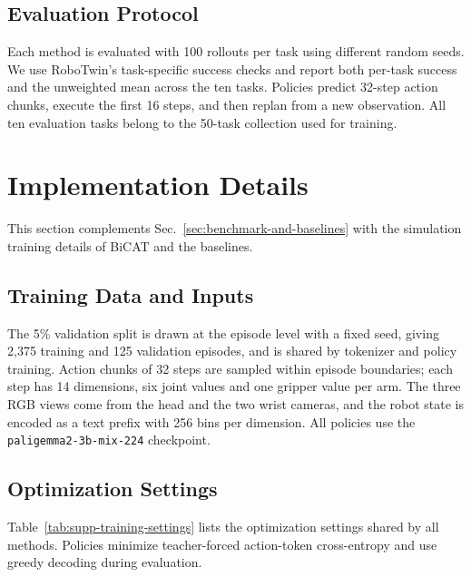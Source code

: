 \subsection{Evaluation Protocol}
\label{app:robotwin-eval-protocol}

Each method is evaluated with 100 rollouts per task using different random
seeds. We use RoboTwin's task-specific success checks and report both
per-task success and the unweighted mean across the ten tasks.
Policies predict 32-step action chunks, execute the first 16 steps, and
then replan from a new observation. All ten evaluation tasks belong to
the 50-task collection used for training.

\section{Implementation Details}
\label{app:baselines}

This section complements Sec.~\ref{sec:benchmark-and-baselines} with the
simulation training details of BiCAT and the baselines.

\subsection{Training Data and Inputs}
\label{app:baseline-data}

The 5\% validation split is drawn at the episode level with a fixed seed,
giving 2,375 training and 125 validation episodes, and is shared by
tokenizer and policy training. Action chunks of 32 steps are sampled within
episode boundaries; each step has 14 dimensions, six joint values and one
gripper value per arm. The three RGB views come from the head and the two
wrist cameras, and the robot state is encoded as a text prefix with 256
bins per dimension. All policies use the
\texttt{paligemma2-3b-mix-224} checkpoint.

\subsection{Optimization Settings}
\label{app:baseline-protocol}

Table~\ref{tab:supp-training-settings} lists the optimization settings
shared by all methods. Policies minimize teacher-forced action-token
cross-entropy and use greedy decoding during evaluation.

